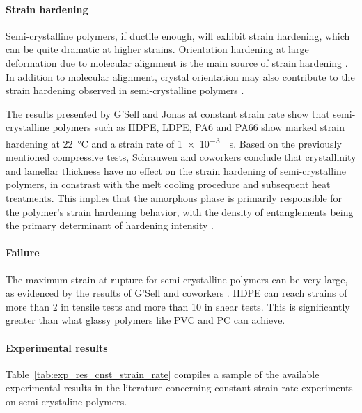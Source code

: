 \paragraph{Strain hardening}
Semi-crystalline polymers, if ductile enough, will exhibit strain hardening, which can be quite dramatic at higher strains.
Orientation hardening at large deformation due to molecular alignment is the main source of strain hardening \citep{ahziModelingDeformationBehavior2003}.
In addition to molecular alignment, crystal orientation may also contribute to the strain hardening observed in semi-crystalline polymers \citep{abdul-hameedTwophaseHyperelasticviscoplasticConstitutive2014}.

The results presented by G'Sell and Jonas \citep{gsellYieldTransientEffects1981} at constant strain rate show that semi-crystalline polymers such as HDPE, LDPE, PA6 and PA66 show marked strain hardening at \SI{22}{\celsius} and a strain rate of \SI{1e-3}{\per\second}.
Based on the previously mentioned compressive tests, Schrauwen and coworkers \citep{schrauwenIntrinsicDeformationBehavior2004} conclude that crystallinity and lamellar thickness have no effect on the strain hardening of semi-crystalline polymers, in constrast with the melt cooling procedure and subsequent heat treatments.
This implies that the amorphous phase is primarily responsible for the polymer's strain hardening behavior, with the density of entanglements being the primary determinant of hardening intensity \citep{argonPhysicsDeformationFracture2013a}.

\paragraph{Failure}
The maximum strain at rupture for semi-crystalline polymers can be very large, as evidenced by the results of G'Sell and coworkers \citep{gsellYieldTransientEffects1981, gsellApplicationPlaneSimple1983}.
HDPE can reach strains of more than 2 in tensile tests and more than 10 in shear tests.
This is significantly greater than what glassy polymers like PVC and PC can achieve.

\paragraph{Experimental results}

Table~\ref{tab:exp_res_cnst_strain_rate} compiles a sample of the available experimental results in the literature concerning constant strain rate experiments on semi-crystaline polymers.

